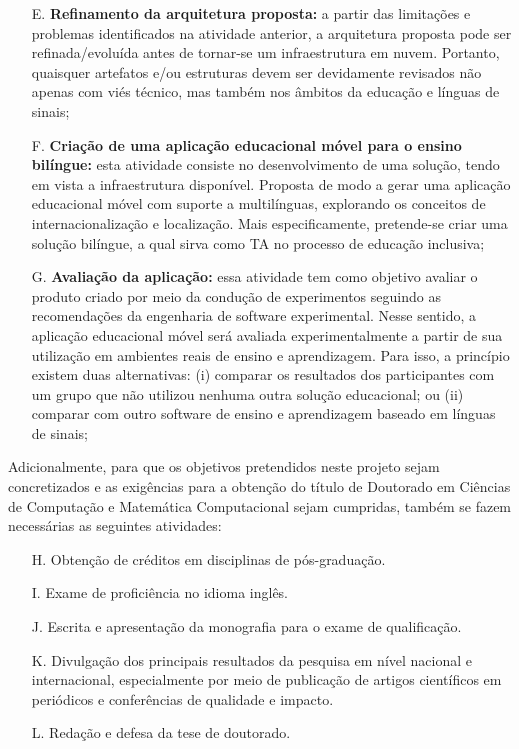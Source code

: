 \begin{enumerate}
    \item [E.]\textbf{Refinamento da arquitetura proposta:} a partir das limitações e problemas identificados na atividade anterior, a arquitetura proposta pode ser refinada/evoluída antes de tornar-se um infraestrutura em nuvem. Portanto, quaisquer artefatos e/ou estruturas devem ser devidamente revisados não apenas com viés técnico, mas também nos âmbitos da educação e línguas de sinais;
    
    \item [F.]\textbf{Criação de uma aplicação educacional móvel para o ensino bilíngue:} esta atividade consiste no desenvolvimento de uma solução, tendo em vista a infraestrutura disponível. Proposta de modo a gerar uma aplicação educacional móvel com suporte a multilínguas, explorando os conceitos de internacionalização e localização. Mais especificamente, pretende-se criar uma solução bilíngue, a qual sirva como TA no processo de educação inclusiva;
    
    \item [G.]\textbf{Avaliação da aplicação:} essa atividade tem como objetivo avaliar o produto criado por meio da condução de experimentos seguindo as recomendações da engenharia de software experimental. Nesse sentido, a aplicação educacional móvel será avaliada experimentalmente a partir de sua utilização em ambientes reais de ensino e aprendizagem. Para isso, a princípio existem duas alternativas: (i) comparar os resultados dos participantes com um grupo que não utilizou nenhuma outra solução educacional; ou (ii) comparar com outro software de ensino e aprendizagem baseado em línguas de sinais;
    
\end{enumerate}

Adicionalmente, para que os objetivos pretendidos neste projeto sejam concretizados e as exigências para a obtenção do título de Doutorado em Ciências de Computação e Matemática Computacional sejam cumpridas, também se fazem necessárias as seguintes atividades:

\begin{enumerate}
    \item[H.] Obtenção de créditos em disciplinas de pós-graduação. 
    \item[I.] Exame de proficiência no idioma inglês.
    \item[J.] Escrita e apresentação da monografia para o exame de qualificação.
    \item[K.] Divulgação dos principais resultados da pesquisa em nível nacional e internacional, especialmente por meio de publicação de artigos científicos em periódicos e conferências de qualidade e impacto.
    \item[L.] Redação e defesa da tese de doutorado.
\end{enumerate}

